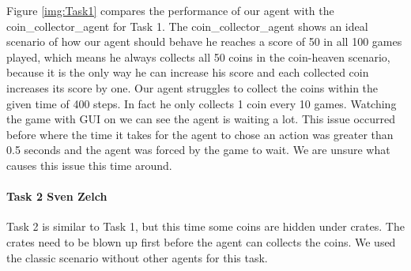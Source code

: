 \documentclass[
	letterpaper, %
	12pt, %
]{CSUniSchoolLabReport}
\begin{document}
Figure \ref{img:Task1} compares the performance of our agent with the coin\_collector\_agent for Task 1.
The coin\_collector\_agent shows an ideal scenario of how our agent should behave he reaches a score of 50 in all 100 games played, which means he always collects all 50 coins in the coin-heaven scenario, because it is the only way he can increase his score and each collected coin increases its score by one.
Our agent struggles to collect the coins within the given time of 400 steps.
In fact he only collects 1 coin every 10 games.
Watching the game with GUI on we can see the agent is waiting a lot.
This issue occurred before where the time it takes for the agent to chose an action was greater than 0.5 seconds and the agent was forced by the game to wait.
We are unsure what causes this issue this time around.

\paragraph{Task 2 \tiny Sven Zelch}

Task 2 is similar to Task 1, but this time some coins are hidden under crates. The crates need to be blown up first before the agent can collects the coins. We used the classic scenario without other agents for this task.
\end{document}
